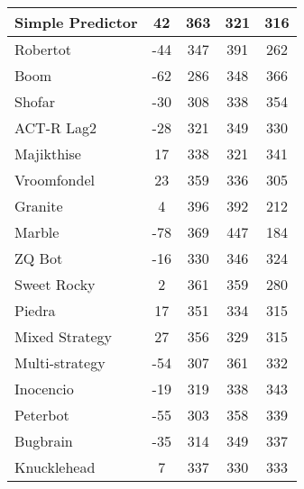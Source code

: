 \begin{table*}
\begin{tabular}{|l|c|c|c|c|}
Simple Predictor & 42 & 363 & 321 & 316 \\ \hline 
Robertot & -44 & 347 & 391 & 262 \\ \hline 
Boom & -62 & 286 & 348 & 366 \\ \hline 
Shofar & -30 & 308 & 338 & 354 \\ \hline 
ACT-R Lag2 & -28 & 321 & 349 & 330 \\ \hline 
Majikthise & 17 & 338 & 321 & 341 \\ \hline 
Vroomfondel & 23 & 359 & 336 & 305 \\ \hline 
Granite & 4 & 396 & 392 & 212 \\ \hline 
Marble & -78 & 369 & 447 & 184 \\ \hline 
ZQ Bot & -16 & 330 & 346 & 324 \\ \hline 
Sweet Rocky & 2 & 361 & 359 & 280 \\ \hline 
Piedra & 17 & 351 & 334 & 315 \\ \hline 
Mixed Strategy & 27 & 356 & 329 & 315 \\ \hline 
Multi-strategy & -54 & 307 & 361 & 332 \\ \hline 
Inocencio & -19 & 319 & 338 & 343 \\ \hline 
Peterbot & -55 & 303 & 358 & 339 \\ \hline 
Bugbrain & -35 & 314 & 349 & 337 \\ \hline 
Knucklehead & 7 & 337 & 330 & 333 \\ \hline
        \end{tabular}
    \end{table*}